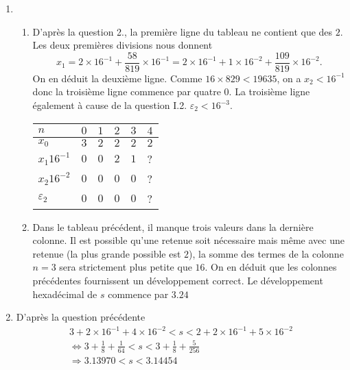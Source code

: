 \begin{enumerate}
 \item
\begin{enumerate}
 \item D'après la question 2., la première ligne du tableau ne contient que des $2$.\newline
Les deux premières divisions nous donnent
\begin{displaymath}
 x_1 = 2\times 16^{-1} + \frac{58}{819}\times 16^{-1}
 = 2\times 16^{-1} + 1\times 16^{-2} + \frac{109}{819}\times 16^{-2}.
\end{displaymath}
On en déduit la deuxième ligne.\newline
Comme $16 \times 829 < 19635$, on a $x_2 <16^{-1}$ donc la troisième ligne commence par quatre $0$. La troisième ligne également à cause de la question I.2. $\varepsilon_2 < 16^{-3}$.
\begin{center} \renewcommand{\arraystretch}{1.2}
\begin{tabular}{l|lllll}
$n$             & $0$ & $1$ & $2$ & $3$ & $4$ \\ \hline
$x_0$           & $3$ & $2$ & $2$ & $2$ & $2$ \\
$x_1 16^{-1}$   & $0$ & $0$ & $2$ & $1$ & ?\\
$x_2 16^{-2}$   & $0$ & $0$ & $0$ & $0$ & ?\\
$\varepsilon_2$ & $0$ & $0$ & $0$ & $0$ & ?
\end{tabular}
\end{center}

 \item Dans le tableau précédent, il manque trois valeurs dans la dernière colonne. Il est possible qu'une retenue soit nécessaire mais même avec une retenue (la plus grande possible est $2$), la somme des termes de la colonne $n=3$ sera strictement plus petite que $16$. On en déduit que les colonnes précédentes fournissent un développement correct.\newline
 Le développement hexadécimal de $s$ commence par $3.24$
\end{enumerate}

 \item D'après la question précédente 
\begin{multline*}
 3 + 2\times 16^{-1} + 4 \times 16^{-2} < s < 2 + 2\times 16^{-1} + 5 \times 16^{-2}  \\
 \Leftrightarrow
 3 + \frac{1}{8} + \frac{1}{64} < s < 3 + \frac{1}{8} + \frac{5}{256} \\
 \Rightarrow 3.13970 < s < 3.14454
\end{multline*}

\end{enumerate}

